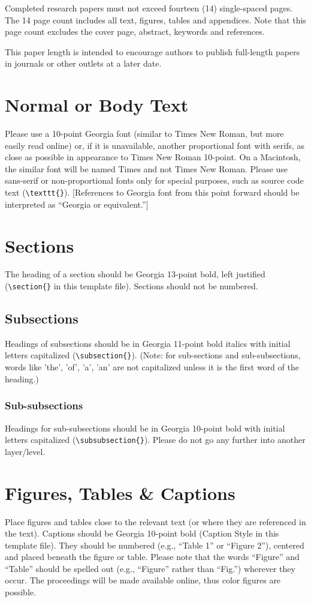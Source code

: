 \documentclass{icisfinal}
\begin{document}
Completed research papers must not exceed fourteen (14) single-spaced pages. The
14 page count includes all text, figures, tables and appendices. Note that this
page count excludes the cover page, abstract, keywords and references. 

This paper length is intended to encourage authors to publish full-length papers
in journals or other outlets at a later date.

\section{Normal or Body Text}
Please use a 10-point Georgia font (similar to Times New Roman, but more easily
read online) or, if it is unavailable, another proportional font with serifs, as
close as possible in appearance to Times New Roman 10-point. On a Macintosh, the
similar font will be named Times and not Times New Roman. Please use sans-serif
or non-proportional fonts only for special purposes, such as source code text
(\texttt{\textbackslash texttt\{\}}). [References to Georgia font from this
point forward should be interpreted as ``Georgia or equivalent.'']

\section{Sections}
The heading of a section should be Georgia 13-point bold, left justified
(\texttt{\textbackslash section\{\}} in this template file).  Sections should not be numbered.

\subsection{Subsections}
Headings of subsections should be in Georgia 11-point bold italics with initial
letters capitalized (\texttt{\textbackslash subsection\{\}}). (Note: for
sub-sections and sub-subsections, words like 'the', 'of', 'a', 'an' are not
capitalized unless it is the first word of the heading.)

\subsubsection{Sub-subsections}
Headings for sub-subsections should be in Georgia 10-point bold with initial
letters capitalized (\texttt{\textbackslash subsubsection\{\}}). Please do not
go any further into another layer/level.

\section{Figures, Tables \& Captions}
Place figures and tables close to the relevant text (or where they are
referenced in the text).  Captions should be Georgia 10-point bold (Caption
Style in this template file).  They should be numbered (e.g., ``Table 1'' or
``Figure 2''), centered and placed beneath the figure or table.  Please note that
the words ``Figure'' and ``Table'' should be spelled out (e.g., ``Figure'' rather than
``Fig.'') wherever they occur. The proceedings will be made available online, thus
color figures are possible.
\end{document}
